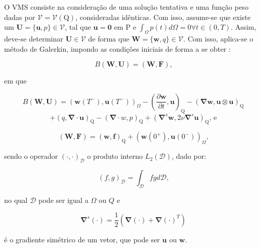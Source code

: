 \documentclass[_ArquivoPrincipal.tex]{subfiles}
\begin{document}
O VMS consiste na consideração de uma solução tentativa e uma função peso dadas por $\mathcal{V}=\mathcal{V}(\mathrm{Q})$, consideradas idênticas. Com isso, assume-se que existe um $\mathbf{U}=\{\mathbf{u},p\}\in\mathcal{V}$, tal que $\mathbf{u}=\mathbf{0}$ em $\mathrm{P}$ e $\int_{\Omega}{p(t)d\Omega}=0\forall t\in(0,T)$. Assim, deve-se determinar $\mathbf{U}\in\mathcal{V}$ de forma que $\mathbf{W}=\{\mathbf{w},q\}\in\mathcal{V}$. Com isso, aplica-se o método de Galerkin, impondo as condições iniciais de forma a se obter \cite{hughes2002variational}:

\begin{equation}
    B(\mathbf{W},\mathbf{U})=(\mathbf{W},\mathbf{F})\text{,}
    \label{B}
\end{equation}

\noindent em que

\[
B(\mathbf{W},\mathbf{U})=(\mathbf{w}(T^-),\mathbf{u}(T^-))_\Omega
-\left(\frac{\partial\mathbf{w}}{\partial t},\mathbf{u}\right)_\mathrm{Q}
-\left(\mathbf{\nabla}\mathbf{w},\mathbf{u}\otimes\mathbf{u}\right)_\mathrm{Q}\]
\begin{equation}
    +\left(q,\mathbf{\nabla}\cdot\mathbf{u}\right)_\mathrm{Q}
    -\left(\mathbf{\nabla}\cdot w,p\right)_\mathrm{Q}
    +\left(\mathbf{\nabla}^s\mathbf{w},2\nu\mathbf{\nabla}^s\mathbf{u}\right)_\mathrm{Q}\text{, e}
    \label{B-2}
\end{equation}

\begin{equation}
    (\mathbf{W},\mathbf{F})=(\mathbf{w},\mathbf{f})_\mathrm{Q}+(\mathbf{w}(0^+),\mathbf{u}(0^-))_\Omega\text{,}
    \label{WF}
\end{equation}

\noindent sendo o operador $(\cdot,\cdot)_\mathcal{D}$ o produto interno $L_2(\mathcal{D})$, dado por:

\begin{equation}
    (f,g)_\mathcal{D}=\int_\mathcal{D}{fgd\mathcal{D}}\text{,}
    \label{L2}
\end{equation}

\noindent no qual $\mathcal{D}$ pode ser igual a $\Omega$ ou $Q$ e \cite{bazilevs2010large}

\begin{equation}
    \mathbf{\nabla}^s(\mathbf{\cdot})=\frac{1}{2}(\mathbf{\nabla}(\mathbf{\cdot})+\mathbf{\nabla}(\mathbf{\cdot})^T)
    \label{nablas}
\end{equation}

\noindent é o gradiente simétrico de um vetor, que pode ser $\mathbf{u}$ ou $\mathbf{w}$.
\end{document}
